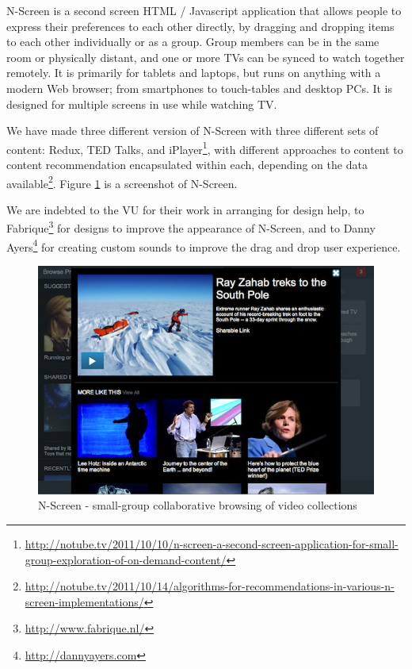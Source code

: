 \documentclass{notube}
\begin{document}
N-Screen is a second screen HTML / Javascript application that allows people to express their preferences to each other directly, by dragging and dropping items to each other individually or as a group. Group members can be in the same room or physically distant, and one or more TVs can be synced to watch together remotely. It is primarily for tablets and laptops, but runs on anything with a modern Web browser; from smartphones to touch-tables and desktop PCs. It is designed for multiple screens in use while watching TV. 

We have made three different version of N-Screen with three different sets of content: Redux, TED Talks, and iPlayer\footnote{\url{http://notube.tv/2011/10/10/n-screen-a-second-screen-application-for-small-group-exploration-of-on-demand-content/}}, with different approaches to content to content recommendation encapsulated within each, depending on the data available\footnote{\url{http://notube.tv/2011/10/14/algorithms-for-recommendations-in-various-n-screen-implementations/}}. Figure \ref{fig:nscreen} is a screenshot of N-Screen.

We are indebted to the VU for their work in arranging for design help, to Fabrique\footnote{\url{http://www.fabrique.nl/}} for designs to improve the appearance of N-Screen, and to Danny Ayers\footnote{\url{http://dannyayers.com}} for creating custom sounds to improve the drag and drop user experience.

\begin{figure}[htbp]
\begin{center}
\includegraphics[width=6in]{images/nscreen.png}
\caption{N-Screen - small-group collaborative browsing of video collections} \label{fig:nscreen}
\end{center}
\end{figure} 
\end{document}
